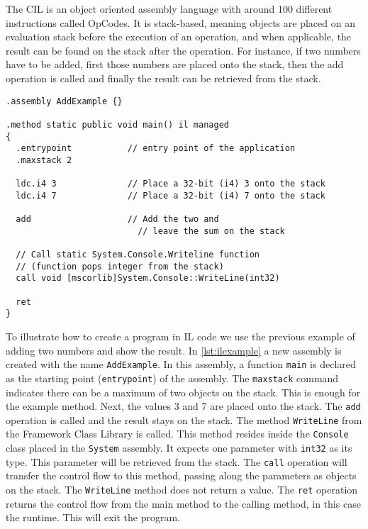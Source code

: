 %
The CIL is an object oriented assembly language with around 100 different instructions called OpCodes.
It is stack-based, meaning objects are placed on an evaluation stack before the execution of an operation, and when applicable, the result can be found on the  stack after the operation.
For instance, if two numbers have to be added, first those numbers are placed onto the stack, then the add operation is called and finally the result can be retrieved from the stack.

\begin{lstlisting}[language=CIL,style=listing,caption={Adding example in IL code},label={lst:ilexample}]
.assembly AddExample {}

.method static public void main() il managed
{
  .entrypoint           // entry point of the application
  .maxstack 2

  ldc.i4 3              // Place a 32-bit (i4) 3 onto the stack
  ldc.i4 7              // Place a 32-bit (i4) 7 onto the stack
	
  add                   // Add the two and 
	                      // leave the sum on the stack
  
  // Call static System.Console.Writeline function
  // (function pops integer from the stack)
  call void [mscorlib]System.Console::WriteLine(int32)

  ret
}
\end{lstlisting}

To illustrate how to create a \dotNET program in IL code we use the previous example of adding two numbers and show the result.
In \autoref{lst:ilexample} a new assembly is created with the name \lstinline|AddExample|.
In this assembly, a function \lstinline|main| is declared as the starting point (\lstinline|entrypoint|) of the assembly.
The \lstinline|maxstack| command indicates there can be a maximum of two objects on the stack. This is enough for the example method.
Next, the values 3 and 7 are placed onto the stack. The \lstinline|add| operation is called and the result stays on the stack.
The method \lstinline|WriteLine| from the \dotNET Framework Class Library is called.
This method resides inside the \lstinline|Console| class placed in the \lstinline|System| assembly.
It expects one parameter with \lstinline|int32| as its type. This parameter will be retrieved from the stack.
The \lstinline|call| operation will transfer the control flow to this method, passing along the parameters as objects on the stack.
The \lstinline|WriteLine| method does not return a value.
The \lstinline|ret| operation returns the control flow from the main method to the calling method, in this case the runtime.
This will exit the program.


